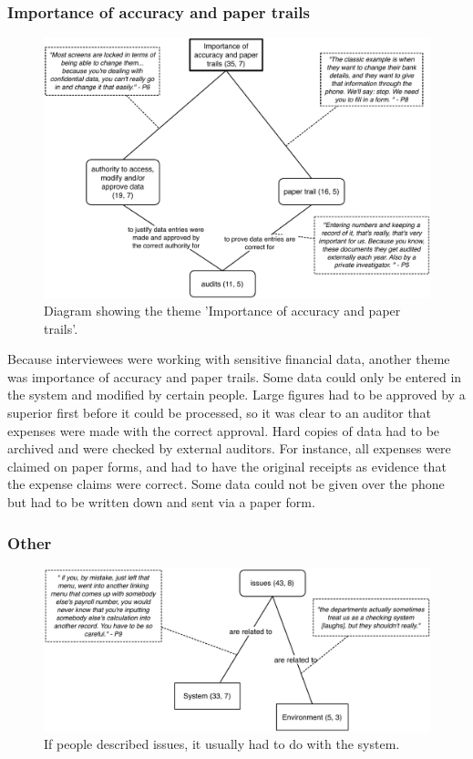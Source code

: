\documentclass[11pt,oneside]{report}
\begin{document}
\subsubsection{Importance of accuracy and paper trails}
\begin{figure}[!ht]
\centering
\includegraphics[width=\textwidth]{images/Study1/Papertrail.pdf}
\caption{Diagram showing the theme 'Importance of accuracy and paper trails'.}
\vspace{-9pt}
\label{fig:ch3_papertrail}
\end{figure}

Because interviewees were working with sensitive financial data, another theme was importance of accuracy and paper trails.
Some data could only be entered in the system and modified by certain people.
Large figures had to be approved by a superior first before it could be processed, so it was clear to an auditor that expenses were made with the correct approval.
Hard copies of data had to be archived and were checked by external auditors. For instance, all expenses were claimed on paper forms, and had to have the original receipts as evidence that the expense claims were correct. Some data could not be given over the phone but had to be written down and sent via a paper form.

\pagebreak

\subsubsection{Other}
\begin{figure}[!ht]
\centering
\includegraphics[width=\textwidth]{images/Study1/Other.pdf}
\caption{If people described issues, it usually had to do with the system.}
\vspace{-9pt}
\label{fig:ch3_other}
\end{figure}
\end{document}
